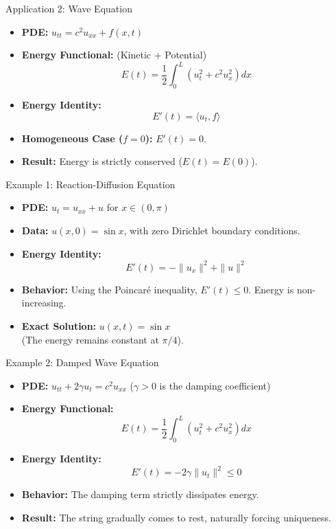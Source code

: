 \documentclass{beamer}
\begin{document}
\begin{frame}{Application 2: Wave Equation}
    \begin{itemize}[<+->]
        \item \textbf{PDE:} $u_{tt} = c^2 u_{xx} + f(x,t)$
        \item \textbf{Energy Functional:} (Kinetic + Potential)
        \[ E(t) = \frac{1}{2} \int_0^L (u_t^2 + c^2 u_x^2) dx \]
        \item \textbf{Energy Identity:} 
        \[ E'(t) = \langle u_t, f \rangle \]
        \item \textbf{Homogeneous Case ($f=0$):} $E'(t) = 0$.
        \item \textbf{Result:} Energy is strictly conserved ($E(t) = E(0)$).
    \end{itemize}
\end{frame}

\begin{frame}{Example 1: Reaction-Diffusion Equation}
    \begin{itemize}[<+->]
        \item \textbf{PDE:} $u_t = u_{xx} + u$ \quad for $x \in (0, \pi)$
        \item \textbf{Data:} $u(x,0) = \sin x$, with zero Dirichlet boundary conditions.
        \item \textbf{Energy Identity:} 
        \[ E'(t) = -\|u_x\|^2 + \|u\|^2 \]
        \item \textbf{Behavior:} Using the Poincar\'e inequality, $E'(t) \le 0$. Energy is non-increasing.
        \item \textbf{Exact Solution:} $u(x,t) = \sin x$ \\ \small (The energy remains constant at $\pi/4$).
    \end{itemize}
\end{frame}

\begin{frame}{Example 2: Damped Wave Equation}
    \begin{itemize}[<+->]
        \item \textbf{PDE:} $u_{tt} + 2\gamma u_t = c^2 u_{xx}$ \quad ($\gamma > 0$ is the damping coefficient)
        \item \textbf{Energy Functional:} 
        \[ E(t) = \frac{1}{2} \int_0^L (u_t^2 + c^2 u_x^2) dx \]
        \item \textbf{Energy Identity:} 
        \[ E'(t) = -2\gamma \|u_t\|^2 \le 0 \]
        \item \textbf{Behavior:} The damping term strictly dissipates energy.
        \item \textbf{Result:} The string gradually comes to rest, naturally forcing uniqueness.
    \end{itemize}
\end{frame}
\end{document}
